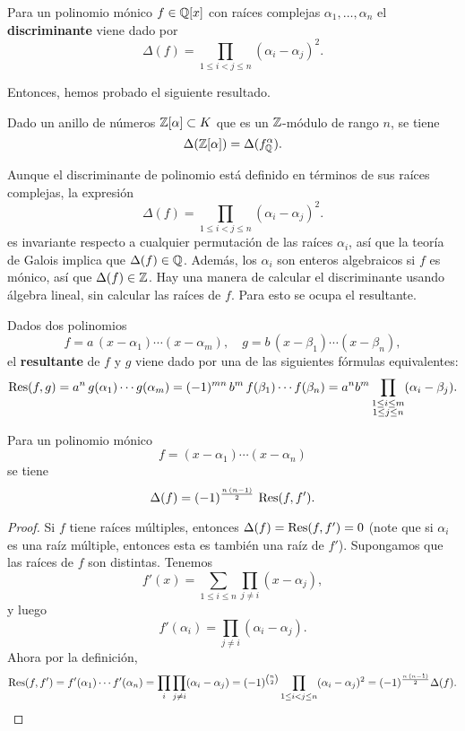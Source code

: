 \begin{definicion}
  Para un polinomio mónico $f \in \mathbb{Q} [x]$ con raíces complejas
  $\alpha_1, \ldots, \alpha_n$ el \textbf{discriminante} viene dado por
  $$\Delta (f) = \prod_{1 \le i < j \le n} (\alpha_i - \alpha_j)^2.$$
\end{definicion}

Entonces, hemos probado el siguiente resultado.

\begin{proposicion}
  Dado un anillo de números $\mathbb{Z} [\alpha] \subset K$ que es un $\mathbb{Z}$-módulo
  de rango $n$, se tiene
  $$\Delta (\mathbb{Z} [\alpha]) = \Delta (f^\alpha_{\mathbb{Q}}).$$
\end{proposicion}

Aunque el discriminante de polinomio está definido en términos de sus raíces
complejas, la expresión
$$\Delta (f) = \prod_{1 \le i < j \le n} (\alpha_i - \alpha_j)^2.$$
es invariante respecto a cualquier permutación de las raíces $\alpha_i$, así que
la teoría de Galois implica que $\Delta (f) \in \mathbb{Q}$. Además, los $\alpha_i$
son enteros algebraicos si $f$ es mónico, así que $\Delta (f) \in \mathbb{Z}$.
Hay una manera de calcular el discriminante usando álgebra lineal, sin calcular
las raíces de $f$. Para esto se ocupa el resultante.

\begin{definicion}
  Dados dos polinomios
  \[ f = a\,(x - \alpha_1)\cdots (x - \alpha_m), \quad
     g = b\,(x - \beta_1)\cdots (x - \beta_n), \]
  el \textbf{resultante} de $f$ y $g$ viene dado por una de las siguientes
  fórmulas equivalentes:
  \[ \operatorname{Res} (f,g) = a^n\,g (\alpha_1) \cdots g (\alpha_m)
      = (-1)^{mn}\,b^m\,f (\beta_1) \cdots f (\beta_n)
      = a^n b^m \prod_{\substack{1 \le i \le m \\ 1 \le j \le n}} (\alpha_i - \beta_j). \]
\end{definicion}

\begin{proposicion}
  Para un polinomio mónico
  $$f = (x - \alpha_1)\cdots (x - \alpha_n)$$
  se tiene
  $$\Delta (f) = (-1)^{\frac{n\,(n-1)}{2}} \, \operatorname{Res} (f,f').$$

  \begin{proof}
    Si $f$ tiene raíces múltiples, entonces $\Delta (f) = \operatorname{Res} (f,f') = 0$
    (note que si $\alpha_i$ es una raíz múltiple, entonces esta es también una
    raíz de $f'$). Supongamos que las raíces de $f$ son distintas. Tenemos
    $$f' (x) = \sum_{1 \le i \le n} \prod_{j\ne i} (x - \alpha_j),$$
    y luego
    $$f' (\alpha_i) = \prod_{j \ne i} (\alpha_i - \alpha_j).$$
    Ahora por la definición,
    \[ \operatorname{Res} (f,f') = f' (\alpha_1) \cdots f' (\alpha_n) =
       \prod_i \prod_{j \ne i} (\alpha_i - \alpha_j) =
       (-1)^{n \choose 2} \prod_{1 \le i < j \le n} (\alpha_i - \alpha_j)^2 =
       (-1)^{\frac{n\,(n-1)}{2}} \Delta (f). \qedhere \]
  \end{proof}
\end{proposicion}

